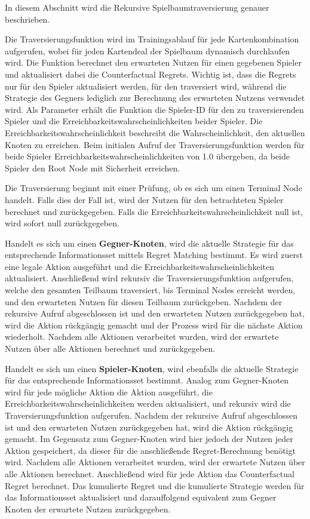 In diesem Abschnitt wird die Rekursive Spielbaumtraversierung genauer beschrieben.

Die Traversierungsfunktion wird im Trainingsablauf für jede Kartenkombination aufgerufen, wobei für jeden Kartendeal der Spielbaum dynamisch durchlaufen wird.
Die Funktion berechnet den erwarteten Nutzen für einen gegebenen Spieler und aktualisiert dabei die Counterfactual Regrets.
Wichtig ist, dass die Regrets nur für den Spieler aktualisiert werden, für den traversiert wird, während die Strategie des Gegners lediglich zur Berechnung des erwarteten Nutzens verwendet wird.
Als Parameter erhält die Funktion die Spieler-ID für den zu traversierenden Spieler und die Erreichbarkeitswahrscheinlichkeiten beider Spieler.
Die Erreichbarkeitswahrscheinlichkeit beschreibt die Wahrscheinlichkeit, den aktuellen Knoten zu erreichen.
Beim initialen Aufruf der Traversierungsfunktion werden für beide Spieler Erreichbarkeitswahrscheinlichkeiten von 1.0 übergeben, da beide Spieler den Root Node mit Sicherheit erreichen.

Die Traversierung beginnt mit einer Prüfung, ob es sich um einen Terminal Node handelt.
Falls dies der Fall ist, wird der Nutzen für den betrachteten Spieler berechnet und zurückgegeben.
Falls die Erreichbarkeitswahrscheinlichkeit null ist, wird sofort null zurückgegeben.

Handelt es sich um einen \textbf{Gegner-Knoten}, wird die aktuelle Strategie für das entsprechende Informationsset mittels Regret Matching bestimmt.
Es wird zuerst eine legale Aktion ausgeführt und die Erreichbarkeitswahrscheinlichkeiten aktualisiert.
Anschließend wird rekursiv die Traversierungsfunktion aufgerufen, welche den gesamten Teilbaum traversiert, bis Terminal Nodes erreicht werden, und den erwarteten Nutzen für diesen Teilbaum zurückgeben.
Nachdem der rekursive Aufruf abgeschlossen ist und den erwarteten Nutzen zurückgegeben hat, wird die Aktion rückgängig gemacht und der Prozess wird für die nächste Aktion wiederholt.
Nachdem alle Aktionen verarbeitet wurden, wird der erwartete Nutzen über alle Aktionen berechnet und zurückgegeben.

Handelt es sich um einen \textbf{Spieler-Knoten}, wird ebenfalls die aktuelle Strategie für das entsprechende Informationsset bestimmt.
Analog zum Gegner-Knoten wird für jede mögliche Aktion die Aktion ausgeführt, die Erreichbarkeitswahrscheinlichkeiten werden aktualisiert, und rekursiv wird die Traversierungsfunktion aufgerufen.
Nachdem der rekursive Aufruf abgeschlossen ist und den erwarteten Nutzen zurückgegeben hat, wird die Aktion rückgängig gemacht.
Im Gegensatz zum Gegner-Knoten wird hier jedoch der Nutzen jeder Aktion gespeichert, da dieser für die anschließende Regret-Berechnung benötigt wird.
Nachdem alle Aktionen verarbeitet wurden, wird der erwartete Nutzen über alle Aktionen berechnet.
Anschließend wird für jede Aktion das Counterfactual Regret berechnet.
Das kumulierte Regret und die kumulierte Strategie werden für das Informationsset aktualisiert und darauffolgend equivalent zum Gegner Knoten der erwartete Nutzen zurückgegeben.

